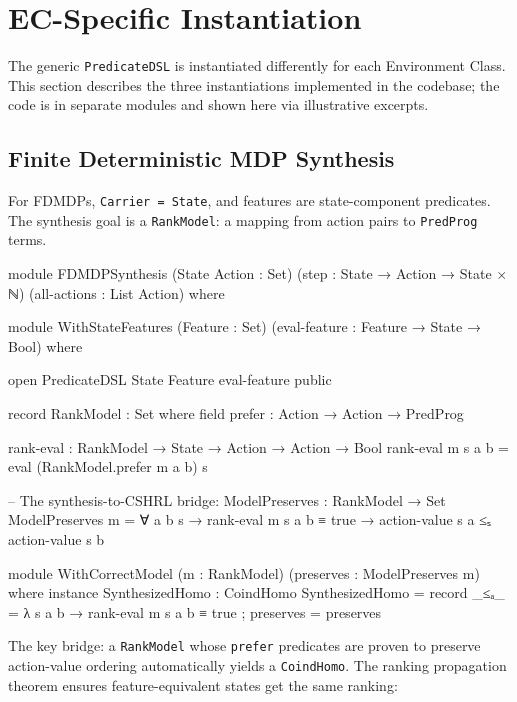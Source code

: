 \documentclass[9pt,a4paper]{article}
\theoremstyle{plain}
\theoremstyle{definition}
\theoremstyle{remark}
\begin{document}

\section{EC-Specific Instantiation}
\label{sec:ec}

The generic \texttt{PredicateDSL} is instantiated differently for each Environment Class.  This section describes the three instantiations implemented in the codebase; the code is in separate modules and shown here via illustrative excerpts.

\subsection{Finite Deterministic MDP Synthesis}

For FDMDPs, \texttt{Carrier = State}, and features are state-component predicates.  The synthesis goal is a \texttt{RankModel}: a mapping from action pairs to \texttt{PredProg} terms.

\begin{spec}
module FDMDPSynthesis (State Action : Set)
  (step : State → Action → State × ℕ) (all-actions : List Action) where

  module WithStateFeatures (Feature : Set)
    (eval-feature : Feature → State → Bool) where

    open PredicateDSL State Feature eval-feature public

    record RankModel : Set where
      field prefer : Action → Action → PredProg

    rank-eval : RankModel → State → Action → Action → Bool
    rank-eval m s a b = eval (RankModel.prefer m a b) s

    -- The synthesis-to-CSHRL bridge:
    ModelPreserves : RankModel → Set
    ModelPreserves m = ∀ a b s →
      rank-eval m s a b ≡ true →
      action-value s a ≤ₛ action-value s b

    module WithCorrectModel (m : RankModel) (preserves : ModelPreserves m) where
      instance
        SynthesizedHomo : CoindHomo
        SynthesizedHomo = record
          { _≤ₐ_ = λ s a b → rank-eval m s a b ≡ true
          ; preserves = preserves }
\end{spec}

\noindent The key bridge: a \texttt{RankModel} whose \texttt{prefer} predicates are proven to preserve action-value ordering automatically yields a \texttt{CoindHomo}.  The ranking propagation theorem ensures feature-equivalent states get the same ranking:
\end{document}
